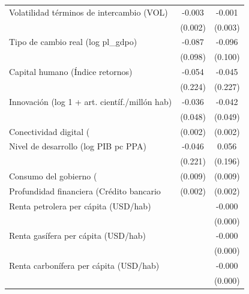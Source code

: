 \begin{table}[htbp]
\begin{tabular}{l*{2}{c}}
\addlinespace
Volatilidad términos de intercambio (VOL)&      -0.003         &      -0.001         \\
                    &     (0.002)         &     (0.003)         \\
\addlinespace
Tipo de cambio real (log pl\_gdpo)&      -0.087         &      -0.096         \\
                    &     (0.098)         &     (0.100)         \\
\addlinespace
Capital humano (Índice retornos)&      -0.054         &      -0.045         \\
                    &     (0.224)         &     (0.227)         \\
\addlinespace
Innovación (log 1 + art. científ./millón hab)&      -0.036         &      -0.042         \\
                    &     (0.048)         &     (0.049)         \\
\addlinespace
Conectividad digital (%
                    &     (0.002)         &     (0.002)         \\
\addlinespace
Nivel de desarrollo (log PIB pc PPA)&      -0.046         &       0.056         \\
                    &     (0.221)         &     (0.196)         \\
\addlinespace
Consumo del gobierno (%
                    &     (0.009)         &     (0.009)         \\
\addlinespace
Profundidad financiera (Crédito bancario %
                    &     (0.002)         &     (0.002)         \\
\addlinespace
Renta petrolera per cápita (USD/hab)&                     &      -0.000         \\
                    &                     &     (0.000)         \\
\addlinespace
Renta gasífera per cápita (USD/hab)&                     &      -0.000\sym{***}\\
                    &                     &     (0.000)         \\
\addlinespace
Renta carbonífera per cápita (USD/hab)&                     &      -0.000         \\
                    &                     &     (0.000)         \\

\end{tabular}
\end{table}
